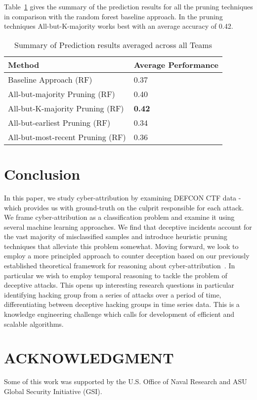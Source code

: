 \documentclass[conference]{IEEEtran}
\begin{document}
Table~\ref{summary} gives the summary of the prediction results for all the pruning techniques in comparison with the random forest baseline approach. In the pruning techniques All-but-K-majority works best with an average accuracy of 0.42.

\begin{table}[h!]
	\caption{\textmd{Summary of Prediction results averaged across all Teams}}
	\label{summary}
	\centering
	\tiny
	\renewcommand{\arraystretch}{1.5}
	
	\begin{tabular}{|p{4cm}|p{2cm}|} 
		\hline
		{\bf Method} &  {\bf Average Performance} \\ \hline \hline
		
		\textsf{Baseline Approach (RF)} & 0.37\\ \hline
		\textsf{All-but-majority Pruning (RF)} & 0.40\\ \hline
		\textsf{All-but-K-majority Pruning (RF)} & \textbf{0.42}\\ \hline
		\textsf{All-but-earliest Pruning (RF)} & 0.34\\ \hline
		\textsf{All-but-most-recent Pruning (RF)} & 0.36\\ \hline
		
	\end{tabular}
	\vspace{-1em}
	
\end{table}



\section{Conclusion}
\label{con}
In this paper, we study cyber-attribution by examining DEFCON CTF data - which provides us with ground-truth on the culprit responsible for each attack. We frame cyber-attribution as a classification problem and examine it using several machine learning approaches. We find that deceptive incidents account for the vast majority of misclassified samples and introduce heuristic pruning techniques that alleviate this problem somewhat. Moving forward, we look to employ a
more principled approach to counter deception based on our previously established theoretical framework for reasoning about cyber-attribution~\cite{shakarian,shakarian14}. In particular we wish to employ temporal reasoning to tackle the problem of deceptive attacks. This opens up interesting research questions in particular identifying hacking group from a series of attacks over a period of time, differentiating between deceptive hacking groups in time series data. This is a knowledge engineering challenge which calls for development of efficient and scalable algorithms. 

\section{ACKNOWLEDGMENT}
Some of this work was supported by the U.S. Office of Naval Research and ASU Global Security Initiative (GSI).





\end{document}

